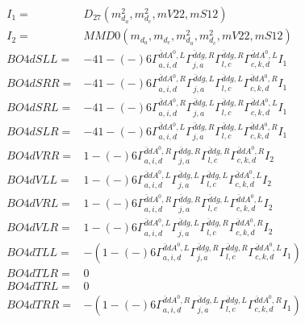 \documentclass[A4,landscape]{article}
\begin{document}
\begin{align} 
I_1 = & D_{27}(m^2_{d_{{a}}}, m^2_{d_{{c}}}, mV22, mS12) \\ 
I_2 = & MMD0(m_{d_{{a}}}, m_{d_{{c}}}, m^2_{d_{{a}}}, m^2_{d_{{c}}}, mV22, mS12) \\ 
  BO4dSLL= & -4   1
-(-)
  6 \Gamma^{\bar{d}d A^0 ,L}_{a, i, d} \Gamma^{\bar{d}d g ,R}_{j, a} \Gamma^{\bar{d}d g ,R}_{l, c} \Gamma^{\bar{d}d A^0 ,L}_{c, k, d} I_1 \\ 
  BO4dSRR= & -4   1
-(-)
  6 \Gamma^{\bar{d}d A^0 ,R}_{a, i, d} \Gamma^{\bar{d}d g ,L}_{j, a} \Gamma^{\bar{d}d g ,L}_{l, c} \Gamma^{\bar{d}d A^0 ,R}_{c, k, d} I_1 \\ 
  BO4dSRL= & -4   1
-(-)
  6 \Gamma^{\bar{d}d A^0 ,R}_{a, i, d} \Gamma^{\bar{d}d g ,L}_{j, a} \Gamma^{\bar{d}d g ,R}_{l, c} \Gamma^{\bar{d}d A^0 ,L}_{c, k, d} I_1 \\ 
  BO4dSLR= & -4   1
-(-)
  6 \Gamma^{\bar{d}d A^0 ,L}_{a, i, d} \Gamma^{\bar{d}d g ,R}_{j, a} \Gamma^{\bar{d}d g ,L}_{l, c} \Gamma^{\bar{d}d A^0 ,R}_{c, k, d} I_1 \\ 
  BO4dVRR= &   1
-(-)
  6 \Gamma^{\bar{d}d A^0 ,R}_{a, i, d} \Gamma^{\bar{d}d g ,R}_{j, a} \Gamma^{\bar{d}d g ,R}_{l, c} \Gamma^{\bar{d}d A^0 ,R}_{c, k, d} I_2 \\ 
  BO4dVLL= &   1
-(-)
  6 \Gamma^{\bar{d}d A^0 ,L}_{a, i, d} \Gamma^{\bar{d}d g ,L}_{j, a} \Gamma^{\bar{d}d g ,L}_{l, c} \Gamma^{\bar{d}d A^0 ,L}_{c, k, d} I_2 \\ 
  BO4dVRL= &   1
-(-)
  6 \Gamma^{\bar{d}d A^0 ,R}_{a, i, d} \Gamma^{\bar{d}d g ,R}_{j, a} \Gamma^{\bar{d}d g ,L}_{l, c} \Gamma^{\bar{d}d A^0 ,L}_{c, k, d} I_2 \\ 
  BO4dVLR= &   1
-(-)
  6 \Gamma^{\bar{d}d A^0 ,L}_{a, i, d} \Gamma^{\bar{d}d g ,L}_{j, a} \Gamma^{\bar{d}d g ,R}_{l, c} \Gamma^{\bar{d}d A^0 ,R}_{c, k, d} I_2 \\ 
  BO4dTLL= & -(  1
-(-)
  6 \Gamma^{\bar{d}d A^0 ,L}_{a, i, d} \Gamma^{\bar{d}d g ,R}_{j, a} \Gamma^{\bar{d}d g ,R}_{l, c} \Gamma^{\bar{d}d A^0 ,L}_{c, k, d} I_1) \\ 
  BO4dTLR= & 0 \\ 
  BO4dTRL= & 0 \\ 
  BO4dTRR= & -(  1
-(-)
  6 \Gamma^{\bar{d}d A^0 ,R}_{a, i, d} \Gamma^{\bar{d}d g ,L}_{j, a} \Gamma^{\bar{d}d g ,L}_{l, c} \Gamma^{\bar{d}d A^0 ,R}_{c, k, d} I_1) \\ 
\end{align} 
\end{document}
